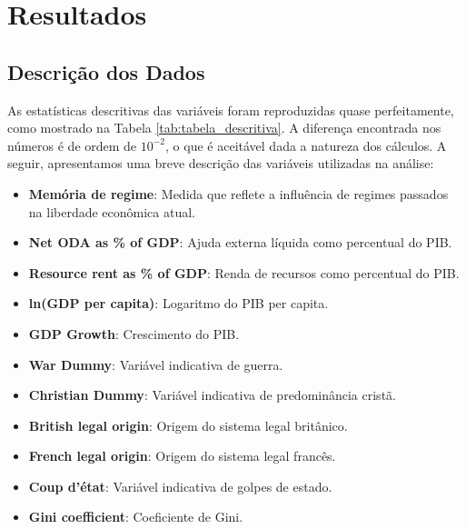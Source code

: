 \section{Resultados}

\subsection{Descrição dos Dados}
As estatísticas descritivas das variáveis foram reproduzidas quase perfeitamente, como mostrado na Tabela \ref{tab:tabela_descritiva}. A diferença encontrada nos números é de ordem de $10^{-2}$, o que é aceitável dada a natureza dos cálculos. A seguir, apresentamos uma breve descrição das variáveis utilizadas na análise:

\begin{itemize}
    \item \textbf{Memória de regime}: Medida que reflete a influência de regimes passados na liberdade econômica atual.
    \item \textbf{Net ODA as \% of GDP}: Ajuda externa líquida como percentual do PIB.
    \item \textbf{Resource rent as \% of GDP}: Renda de recursos como percentual do PIB.
    \item \textbf{ln(GDP per capita)}: Logaritmo do PIB per capita.
    \item \textbf{GDP Growth}: Crescimento do PIB.
    \item \textbf{War Dummy}: Variável indicativa de guerra.
    \item \textbf{Christian Dummy}: Variável indicativa de predominância cristã.
    \item \textbf{British legal origin}: Origem do sistema legal britânico.
    \item \textbf{French legal origin}: Origem do sistema legal francês.
    \item \textbf{Coup d'état}: Variável indicativa de golpes de estado.
    \item \textbf{Gini coefficient}: Coeficiente de Gini.
\end{itemize}

